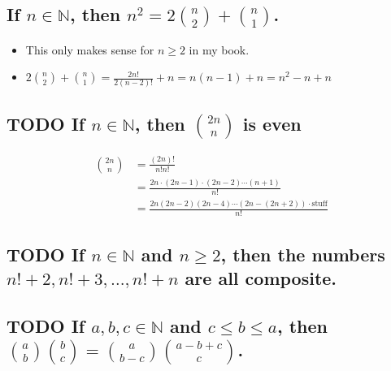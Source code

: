 \documentclass[11pt, oneside]{amsart}
\begin{document}
\subsection{If \(n \in \mathbb{N}\), then \(n^2 = 2{n \choose 2}+ {n \choose 1}\).}
\label{sec:org55a44eb}
\begin{itemize}
\item This only makes sense for \(n \geq 2\) in my book.
\item \(2{n \choose 2} + {n \choose 1} = \frac{2n!}{2(n-2)!} + n = n(n-1)+n = n^2-n+n\)
\end{itemize}

\subsection{{\bfseries\sffamily TODO} If \(n \in \mathbb{N}\), then \({2n \choose n}\) is even}
\label{sec:org1459762}

\begin{align*}
{2n \choose n} &= \frac{(2n)!}{n!n!} \\ &= \frac{2n \cdot (2n-1) \cdot (2n-2) \dotsb  (n+1)}{ n! } \\ 
&= \frac{2n (2n-2) (2n-4) \dotsb (2n-(2n+2)) \cdot \text{stuff}}{n!} 
\end{align*}


\subsection{{\bfseries\sffamily TODO} If \(n \in \mathbb{N}\) and \(n \geq 2\), then the numbers \(n!+2, n!+3, \dotsc, n!+n\) are all composite.}
\label{sec:org60a2627}

\subsection{{\bfseries\sffamily TODO} If \(a,b,c \in \mathbb{N}\) and \(c \leq b \leq a\), then \({a \choose b} {b \choose c} = {a \choose b-c} {a-b+c \choose c}\).}
\label{sec:org317e312}
\end{document}
